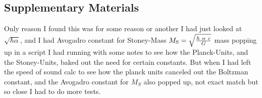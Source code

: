 \begin{multicols}{2}
%

\setcounter{table}{0}
\renewcommand{\thetable}{S\arabic{table}}%
\setcounter{figure}{0}
\renewcommand{\thefigure}{S\arabic{figure}}%
\subsection*{Supplementary Materials}
Only reason I found this was for some reason or another I had just looked at $\sqrt{\hbar \alpha}$, and I had Avogadro constant for Stoney-Mass $M_{{\text{S}}} = \sqrt{\hbar ~ \alpha ~c \over G}$ mass popping up in a script I had running with some notes to see how the Planck-Units, and the Stoney-Units\citep{Stoney1883}, baked out the need for certain constants. But when I had left the speed of sound calc to see how the planck units canceled out the Boltzman constant, and the Avogadro constant for $M_S$ also popped up, not exact match but so close I had to do more tests.%
\end{multicols}

